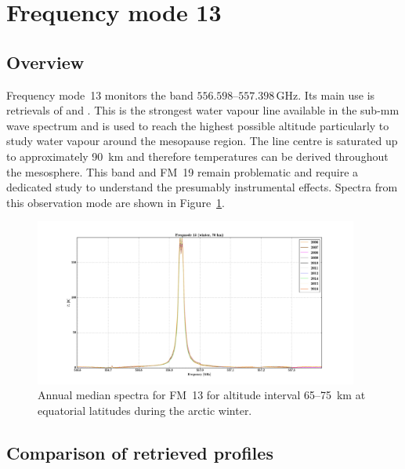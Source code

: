 \section{Frequency mode 13}
\label{sec:fm13}

\subsection{Overview}
\label{sec:fm13:overview}
Frequency mode~13 monitors the band $556.598$--$557.398\,\mathrm{GHz}$. Its
main use is retrievals of  and .
This is the strongest water vapour line available in the sub-mm wave spectrum
and is used to reach the  highest possible altitude particularly to study
water vapour around the mesopause region.  The line centre is saturated up to
approximately 90~km and therefore temperatures can be derived throughout the
mesosphere. This band and FM~19 remain problematic and require a dedicated
study to understand the presumably instrumental effects.
Spectra from this observation mode are shown in Figure~\ref{fig:spectra:13}.

\begin{figure}[ht]
    \centering
    \includegraphics[width=0.95\textwidth]{../DDS/figures/spectra/fm_13_spectra_winter}
    \caption{Annual median spectra for FM~13 for altitude interval 65--75~km at
        equatorial latitudes during the arctic winter.
    }\label{fig:spectra:13}
\end{figure}


\subsection{Comparison of retrieved profiles}
\label{sec:fm13:comparison}



